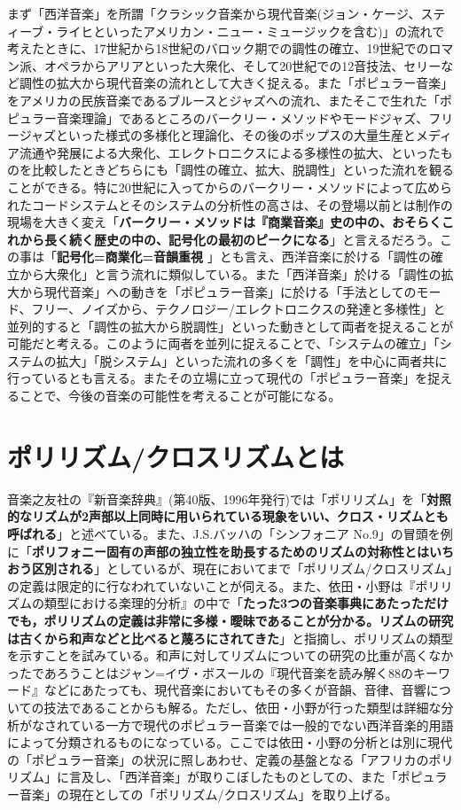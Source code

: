 \documentclass[uplatex,dvipdfmx]{ujarticle}
\begin{document}
まず「西洋音楽」を所謂「クラシック音楽から現代音楽(ジョン・ケージ、スティーブ・ライヒといったアメリカン・ニュー・ミュージックを含む)」の流れで考えたときに、17世紀から18世紀のバロック期での調性の確立、19世紀でのロマン派、オペラからアリアといった大衆化、そして20世紀での12音技法、セリーなど調性の拡大から現代音楽の流れとして大きく捉える。また「ポピュラー音楽」をアメリカの民族音楽であるブルースとジャズへの流れ、またそこで生れた「ポピュラー音楽理論」であるところのバークリー・メソッドやモードジャズ、フリージャズといった様式の多様化と理論化、その後のポップスの大量生産とメディア流通や発展による大衆化、エレクトロニクスによる多様性の拡大、といったものを比較したときどちらにも「調性の確立、拡大、脱調性」といった流れを観ることができる。特に20世紀に入ってからのバークリー・メソッドによって広められたコードシステムとそのシステムの分析性の高さは、その登場以前とは制作の現場を大きく変え「{\bf バークリー・メソッドは『商業音楽』史の中の、おそらくこれから長く続く歴史の中の、記号化の最初のピークになる}」\cite{kikuchi-ootani:01}と言えるだろう。この事は「{\bf 記号化=商業化=音韻重視 }」\cite{kikuchi-ootani:01}とも言え、西洋音楽に於ける「調性の確立から大衆化」と言う流れに類似している。また「西洋音楽」於ける「調性の拡大から現代音楽」への動きを「ポピュラー音楽」に於ける「手法としてのモード、フリー、ノイズから、テクノロジー/エレクトロニクスの発達と多様性」と並列的すると「調性の拡大から脱調性」といった動きとして両者を捉えることが可能だと考える。このように両者を並列に捉えることで、「システムの確立」「システムの拡大」「脱システム」といった流れの多くを「調性」を中心に両者共に行っているとも言える。またその立場に立って現代の「ポピュラー音楽」を捉えることで、今後の音楽の可能性を考えることが可能になる。

\section{ポリリズム/クロスリズムとは}

音楽之友社の『新音楽辞典』(第40版、1996年発行)では「ポリリズム」を「{\bf 対照的なリズムが2声部以上同時に用いられている現象をいい、クロス・リズムとも呼ばれる}」\cite{asaka:01}と述べている。また、J.S.バッハの「シンフォニア No.9」の冒頭を例に「{\bf ポリフォニー固有の声部の独立性を助長するためのリズムの対称性とはいちおう区別される}」\cite{asaka:01}としているが、現在においてまで「ポリリズム/クロスリズム」の定義は限定的に行なわれていないことが伺える。また、依田・小野は『ポリリズムの類型における楽理的分析』の中で「{\bf たった3つの音楽事典にあたっただけでも，ポリリズムの定義は非常に多様・曖昧であることが分かる。リズムの研究は古くから和声などと比ベると蔑ろにされてきた}」\cite{yoda-ono:01}と指摘し、ポリリズムの類型を示すことを試みている。和声に対してリズムについての研究の比重が高くなかったであろうことはジャン=イヴ・ボスールの『現代音楽を読み解く88のキーワード』などにあたっても、現代音楽においてもその多くが音韻、音律、音響についての技法であることからも解る。ただし、依田・小野が行った類型は詳細な分析がなされている一方で現代のポピュラー音楽では一般的でない西洋音楽的用語によって分類されるものになっている。ここでは依田・小野の分析とは別に現代の「ポピュラー音楽」の状況に照しあわせ、定義の基盤となる「アフリカのポリリズム」に言及し、「西洋音楽」が取りこぼしたものとしての、また「ポピュラー音楽」の現在としての「ポリリズム/クロスリズム」を取り上げる。
\end{document}
